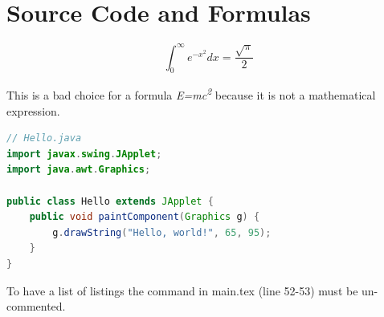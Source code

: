 \chapter{Source Code and Formulas}
\label{chap:source-code-and-formulas}

\begin{equation} 
    \int_0^\infty e^{-x^2} dx=\frac{\sqrt{\pi}}{2} 
    \label{eq:test-formula}
\end{equation}

This is a bad choice for a formula \textit{E=mc\textsuperscript{2}} because it is not a mathematical expression.

\begin{lstlisting}[caption={Java Code Example}, captionpos=b, label={lst:example-java}, language=Java]
// Hello.java
import javax.swing.JApplet;
import java.awt.Graphics;

public class Hello extends JApplet {
    public void paintComponent(Graphics g) {
        g.drawString("Hello, world!", 65, 95);
    }    
}
\end{lstlisting}

To have a list of listings the command in main.tex (line 52-53) must be un-commented.
